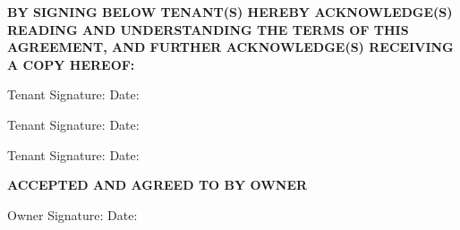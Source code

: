\documentclass[8pt, letterpaper, oneside]{extarticle}
\begin{document}
 \textbf{BY SIGNING BELOW TENANT(S) HEREBY ACKNOWLEDGE(S) READING AND UNDERSTANDING THE TERMS OF THIS AGREEMENT, AND FURTHER ACKNOWLEDGE(S) RECEIVING A COPY HEREOF:}

 \vspace{10mm}

 Tenant Signature: \hspace{5mm} \underline{\hspace{90mm}} \hspace{10mm} Date: \hspace{5mm} \underline{\hspace{40mm}}

 \vspace{10mm}

 Tenant Signature: \hspace{5mm} \underline{\hspace{90mm}} \hspace{10mm} Date: \hspace{5mm} \underline{\hspace{40mm}}

 \vspace{10mm}

 Tenant Signature: \hspace{5mm} \underline{\hspace{90mm}} \hspace{10mm} Date: \hspace{5mm} \underline{\hspace{40mm}}

 \vspace{10mm}

 \textbf{ACCEPTED AND AGREED TO BY OWNER}

 \vspace{10mm} 
 Owner Signature: \hspace{5mm} \underline{\hspace{90mm}} \hspace{10mm} Date: \hspace{5mm} \underline{\hspace{40mm}}

 
\end{document}
